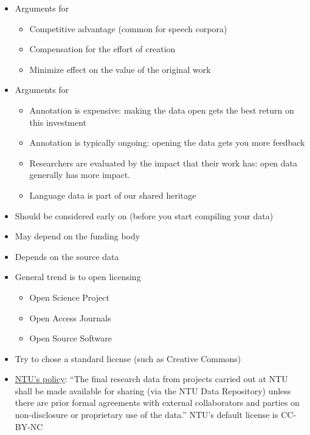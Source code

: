 \documentclass[a4paper,landscape,headrule,footrule,xetex]{foils}
\begin{document}
\MyLogo{}
\begin{itemize}
\item Arguments for 
  \begin{itemize}
  \item Competitive advantage (common for speech corpora)
  \item Compensation for the effort of creation
  \item Minimize effect on the value of the original work
  \end{itemize}
\item Arguments for 
  \begin{itemize}
  \item Annotation is expensive: making the data open gets the best
    return on this investment
  \item Annotation is typically ongoing: opening the data gets you
    more feedback
 \item Researchers are evaluated by the impact that their work has: open data generally has more impact.
  \item Language data is part of our shared heritage
  \end{itemize}
\end{itemize}

\begin{itemize}
\item Should be considered early on (before you start compiling your data)
\item May depend on the funding body
\item Depends on the source data
\item General trend is to open licensing
  \begin{itemize}
  \item Open Science Project
  \item Open Access Journals
  \item Open Source Software
  \end{itemize}
\item Try to chose a standard license (such as Creative Commons)
\item \href{http://research.ntu.edu.sg/rieo/RI/Pages/Research-Data-Policies.aspx}{NTU's policy}: ``The final research data from projects carried out
  at NTU shall be made available for sharing (via the NTU Data
  Repository) unless there are prior formal agreements with external
  collaborators and parties on non-disclosure or proprietary use of
  the data.''  NTU's default license is CC-BY-NC 

\end{itemize}
\end{document}

